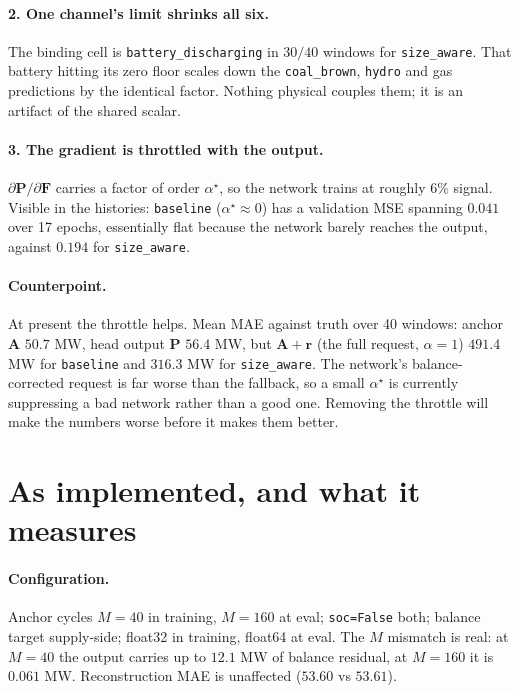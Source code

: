 \documentclass[11pt]{article}
\begin{document}
\paragraph{2. One channel's limit shrinks all six.} The binding cell is
\texttt{battery\_discharging} in $30/40$ windows for \texttt{size\_aware}. That
battery hitting its zero floor scales down the \texttt{coal\_brown},
\texttt{hydro} and gas predictions by the identical factor. Nothing physical
couples them; it is an artifact of the shared scalar.

\paragraph{3. The gradient is throttled with the output.}
$\partial\mathbf{P}/\partial\mathbf{F}$ carries a factor of order
$\alpha^{\star}$, so the network trains at roughly $6\%$ signal. Visible in the
histories: \texttt{baseline} ($\alpha^{\star}\!\approx\!0$) has a validation MSE
spanning $0.041$ over 17 epochs, essentially flat because the network barely
reaches the output, against $0.194$ for \texttt{size\_aware}.

\paragraph{Counterpoint.} At present the throttle helps. Mean MAE against truth
over 40 windows: anchor $\mathbf{A}$ $50.7$ MW, head output $\mathbf{P}$
$56.4$ MW, but $\mathbf{A}+\mathbf{r}$ (the full request, $\alpha=1$)
$491.4$ MW for \texttt{baseline} and $316.3$ MW for \texttt{size\_aware}. The
network's balance-corrected request is far worse than the fallback, so a small
$\alpha^{\star}$ is currently suppressing a bad network rather than a good one.
Removing the throttle will make the numbers worse before it makes them better.

\section{As implemented, and what it measures}
\label{sec:measured}

\paragraph{Configuration.} Anchor cycles $M=40$ in training,
$M=160$ at eval; \texttt{soc=False} both; balance target supply-side; float32 in
training, float64 at eval. The $M$ mismatch is real: at $M=40$ the output carries
up to $12.1$ MW of balance residual, at $M=160$ it is $0.061$ MW. Reconstruction
MAE is unaffected ($53.60$ vs $53.61$).
\end{document}
